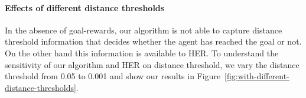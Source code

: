 \paragraph{Effects of different distance thresholds}

In the absence of goal-rewards, our algorithm is not able to capture distance
threshold information that decides whether the agent has reached the goal or
not. On the other hand this information is available to HER. To understand the
sensitivity of our algorithm and HER on distance threshold, we vary the distance
threshold from 0.05 to 0.001 and show our results in
Figure~\ref{fig:with-different-distance-thresholds}.



